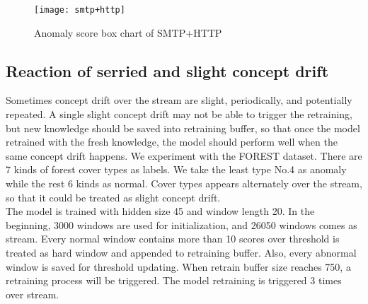 \begin{figure}[h]
\centering
\texttt{[image: smtp+http]}
\caption[Anomaly score box chart of SMTP+HTTP]{Anomaly score box chart of SMTP+HTTP}
\label{fig:smtp+http}
\end{figure}

\subsection{Reaction of serried and slight concept drift}
\label{sec:reaction}

Sometimes concept drift over the stream are slight, periodically, and potentially repeated. A single slight concept drift may not be able to trigger the retraining, but new knowledge should be saved into retraining buffer, so that once the model retrained with the fresh knowledge, the model should perform well when the same concept drift happens. We experiment with the FOREST dataset. There are 7 kinds of forest cover types as labels. We take the least type No.4 as anomaly while the rest 6 kinds as normal. Cover types appears alternately over the stream, so that it could be treated as slight concept drift.\\

The model is trained with hidden size 45 and window length 20. In the beginning, 3000 windows are used for initialization, and 26050 windows comes as stream.  Every normal window contains more than 10 scores over threshold is treated as hard window and appended to retraining buffer. Also, every abnormal window is saved for threshold updating.  When retrain buffer size reaches 750, a retraining process will be triggered. The model retraining is triggered 3 times over stream. 

